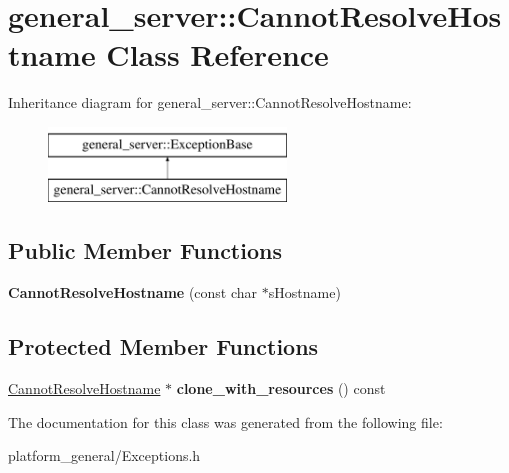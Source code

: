 \hypertarget{classgeneral__server_1_1CannotResolveHostname}{\section{general\-\_\-server\-:\-:\-Cannot\-Resolve\-Hostname \-Class \-Reference}
\label{classgeneral__server_1_1CannotResolveHostname}
}
\-Inheritance diagram for general\-\_\-server\-:\-:\-Cannot\-Resolve\-Hostname\-:\begin{figure}[H]
\begin{center}
\leavevmode
\includegraphics[height=2.000000cm]{classgeneral__server_1_1CannotResolveHostname}
\end{center}
\end{figure}
\subsection*{\-Public \-Member \-Functions}
\begin{DoxyCompactItemize}
\item 
\hypertarget{classgeneral__server_1_1CannotResolveHostname_a9bdfbcc81668405cadb405dfec66639d}{{\bfseries \-Cannot\-Resolve\-Hostname} (const char $\ast$s\-Hostname)}\label{classgeneral__server_1_1CannotResolveHostname_a9bdfbcc81668405cadb405dfec66639d}

\end{DoxyCompactItemize}
\subsection*{\-Protected \-Member \-Functions}
\begin{DoxyCompactItemize}
\item 
\hypertarget{classgeneral__server_1_1CannotResolveHostname_affbe047362de04a0b0f4c4c677cf29f1}{\hyperlink{classgeneral__server_1_1CannotResolveHostname}{\-Cannot\-Resolve\-Hostname} $\ast$ {\bfseries clone\-\_\-with\-\_\-resources} () const }\label{classgeneral__server_1_1CannotResolveHostname_affbe047362de04a0b0f4c4c677cf29f1}

\end{DoxyCompactItemize}


\-The documentation for this class was generated from the following file\-:\begin{DoxyCompactItemize}
\item 
platform\-\_\-general/\-Exceptions.\-h\end{DoxyCompactItemize}
